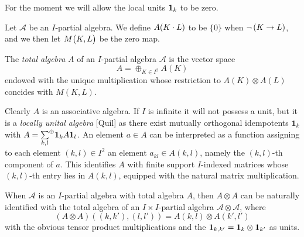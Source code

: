 \begin{Rem} For the moment we will allow the local units $\mathbf{1}_k$ to be zero.
\end{Rem}

Let $\mathscr{A}$ be an $I$-partial algebra. We define $A(K\cdot L)$ to be $\{0\}$ when $\neg \left(K\rightarrow L\right)$, and we then let $M{\begin{pmatrix} K, L\end{pmatrix}}$ be the zero map.

\begin{Def} The \emph{total algebra} $A$ of an $I$-partial algebra $\mathscr{A}$ is the vector space \[A = \oplus_{K\in I^2} A(K)\] endowed with the unique multiplication whose restriction to $A(K)\otimes A(L)$ concides with $M(K,L)$.  
\end{Def} 

Clearly $A$ is an associative algebra. If $I$ is infinite it will not possess a unit, but it is a \emph{locally unital algebra} [Quil] as there exist mutually orthogonal idempotents $\mathbf{1}_k$ with $A = \underset{k,l}{\sum}^{\oplus} \mathbf{1}_kA\mathbf{1}_l$. An element $a\in A$ can be interpreted as a function assigning to each element $(k,l)\in I^2$ an element $a_{kl}\in A(k,l)$, namely the $(k,l)$-th component of $a$. This identifies $A$ with finite support $I$-indexed matrices whose $(k,l)$-th entry lies in $A(k,l)$, equipped with the natural matrix multiplication. 

\begin{Rem}\label{RemGrad} When $\mathscr{A}$ is an $I$-partial algebra with total algebra $A$, then $A\otimes A$ can be naturally identified with the total algebra of an $I\times I$-partial algebra $\mathscr{A}\otimes \mathscr{A}$, where \[(A\otimes A)((k,k'),(l,l')) = A(k,l)\otimes A(k',l')\] with the obvious tensor product multiplications and the $\mathbf{1}_{k,k'} = \mathbf{1}_k\otimes \mathbf{1}_{k'}$ as units. 
\end{Rem} 


